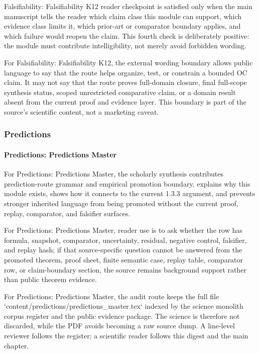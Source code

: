 Falsifiability: Falsifiability K12 reader checkpoint is satisfied only when the main manuscript tells the reader which claim class this module can support, which evidence class limits it, which prior-art or comparator boundary applies, and which failure would reopen the claim. This fourth check is deliberately positive: the module must contribute intelligibility, not merely avoid forbidden wording.


For Falsifiability: Falsifiability K12, the external wording boundary allows public language to say that the route helps organize, test, or constrain a bounded OC claim. It may not say that the route proves full-domain closure, final full-scope synthesis status, scoped unrestricted comparative claim, or a domain result absent from the current proof and evidence layer. This boundary is part of the source's scientific content, not a marketing caveat.


\subsubsection{Predictions}

\paragraph{Predictions: Predictions Master}

For Predictions: Predictions Master, the scholarly synthesis contributes prediction-route grammar and empirical promotion boundary, explains why this module exists, shows how it connects to the current 1.3.3 argument, and prevents stronger inherited language from being promoted without the current proof, replay, comparator, and falsifier surfaces.


For Predictions: Predictions Master, reader use is to ask whether the row has formula, snapshot, comparator, uncertainty, residual, negative control, falsifier, and replay hash; if that source-specific question cannot be answered from the promoted theorem, proof sheet, finite semantic case, replay table, comparator row, or claim-boundary section, the source remains background support rather than public theorem evidence.


For Predictions: Predictions Master, the audit route keeps the full file `content/predictions/predictions\_master.tex` indexed by the science monolith corpus register and the public evidence package. The science is therefore not discarded, while the PDF avoids becoming a raw source dump. A line-level reviewer follows the register; a scientific reader follows this digest and the main chapter.


